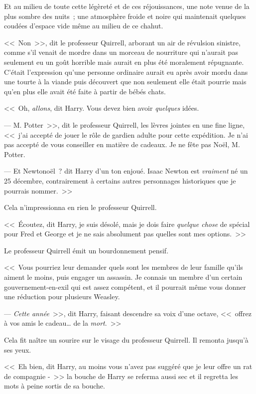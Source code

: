 Et au milieu de toute cette légèreté et de ces réjouissances, une note venue de la plus sombre des nuits~; une atmosphère froide et noire qui maintenait quelques coudées d'espace vide même au milieu de ce chahut.

<<~Non~>>, dit le professeur Quirrell, arborant un air de révulsion sinistre, comme s'il venait de mordre dans un morceau de nourriture qui n'aurait pas seulement eu un goût horrible mais aurait en plus été moralement répugnante. C'était l'expression qu'une personne ordinaire aurait eu après avoir mordu dans une tourte à la viande puis découvert que non seulement elle était pourrie mais qu'en plus elle avait été faite à partir de bébés chats.

<<~Oh, \emph{allons}, dit Harry. Vous devez bien avoir \emph{quelques} idées.

--- M. Potter~>>, dit le professeur Quirrell, les lèvres jointes en une fine ligne, <<~j'ai accepté de jouer le rôle de gardien adulte pour cette expédition. Je n'ai pas accepté de vous conseiller en matière de cadeaux. Je ne fête pas Noël, M. Potter.

--- Et Newtonoël~? dit Harry d'un ton enjoué. Isaac Newton est \emph{vraiment} né un 25 décembre, contrairement à certains autres personnages historiques que je pourrais nommer.~>>

Cela n'impressionna en rien le professeur Quirrell.

<<~Écoutez, dit Harry, je suis désolé, mais je dois faire \emph{quelque chose} de spécial pour Fred et George et je ne sais absolument pas quelles sont mes options.~>>

Le professeur Quirrell émit un bourdonnement pensif.

<<~Vous pourriez leur demander quels sont les membres de leur famille qu'ils aiment le moins, puis engager un assassin. Je connais un membre d'un certain gouvernement-en-exil qui est assez compétent, et il pourrait même vous donner une réduction pour plusieurs Weasley.

--- \emph{Cette année}~>>, dit Harry, faisant descendre sa voix d'une octave, <<~offrez à vos amis le cadeau… de la \emph{mort}.~>>

Cela fit naître un sourire sur le visage du professeur Quirrell. Il remonta jusqu'à ses yeux.

<<~Eh bien, dit Harry, au moins vous n'avez pas suggéré que je leur offre un rat de compagnie -~>> la bouche de Harry se referma aussi sec et il regretta les mots à peine sortis de sa bouche.

